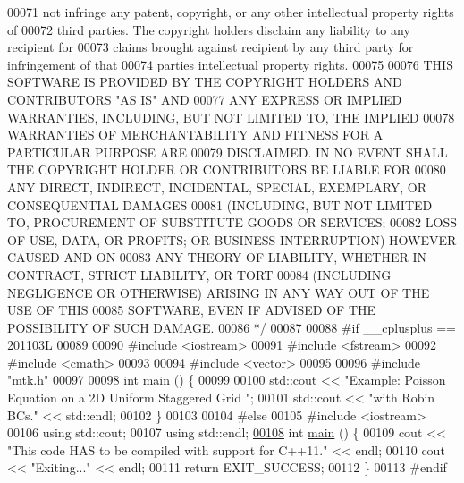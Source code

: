 \begin{DoxyCode}
00071 \textcolor{comment}{not infringe any patent, copyright, or any other intellectual property rights of}
00072 \textcolor{comment}{third parties. The copyright holders disclaim any liability to any recipient for}
00073 \textcolor{comment}{claims brought against recipient by any third party for infringement of that}
00074 \textcolor{comment}{parties intellectual property rights.}
00075 \textcolor{comment}{}
00076 \textcolor{comment}{THIS SOFTWARE IS PROVIDED BY THE COPYRIGHT HOLDERS AND CONTRIBUTORS "AS IS" AND}
00077 \textcolor{comment}{ANY EXPRESS OR IMPLIED WARRANTIES, INCLUDING, BUT NOT LIMITED TO, THE IMPLIED}
00078 \textcolor{comment}{WARRANTIES OF MERCHANTABILITY AND FITNESS FOR A PARTICULAR PURPOSE ARE}
00079 \textcolor{comment}{DISCLAIMED. IN NO EVENT SHALL THE COPYRIGHT HOLDER OR CONTRIBUTORS BE LIABLE FOR}
00080 \textcolor{comment}{ANY DIRECT, INDIRECT, INCIDENTAL, SPECIAL, EXEMPLARY, OR CONSEQUENTIAL DAMAGES}
00081 \textcolor{comment}{(INCLUDING, BUT NOT LIMITED TO, PROCUREMENT OF SUBSTITUTE GOODS OR SERVICES;}
00082 \textcolor{comment}{LOSS OF USE, DATA, OR PROFITS; OR BUSINESS INTERRUPTION) HOWEVER CAUSED AND ON}
00083 \textcolor{comment}{ANY THEORY OF LIABILITY, WHETHER IN CONTRACT, STRICT LIABILITY, OR TORT}
00084 \textcolor{comment}{(INCLUDING NEGLIGENCE OR OTHERWISE) ARISING IN ANY WAY OUT OF THE USE OF THIS}
00085 \textcolor{comment}{SOFTWARE, EVEN IF ADVISED OF THE POSSIBILITY OF SUCH DAMAGE.}
00086 \textcolor{comment}{*/}
00087 
00088 \textcolor{preprocessor}{#if \_\_cplusplus == 201103L}
00089 
00090 \textcolor{preprocessor}{#include <iostream>}
00091 \textcolor{preprocessor}{#include <fstream>}
00092 \textcolor{preprocessor}{#include <cmath>}
00093 
00094 \textcolor{preprocessor}{#include <vector>}
00095 
00096 \textcolor{preprocessor}{#include "\hyperlink{mtk_8h}{mtk.h}"}
00097 
00098 \textcolor{keywordtype}{int} \hyperlink{poisson__2d_8cc_ae66f6b31b5ad750f1fe042a706a4e3d4}{main} () \{
00099 
00100   std::cout << \textcolor{stringliteral}{"Example: Poisson Equation on a 2D Uniform Staggered Grid "};
00101   std::cout << \textcolor{stringliteral}{"with Robin BCs."} << std::endl;
00102 \}
00103 
00104 \textcolor{preprocessor}{#else}
00105 \textcolor{preprocessor}{#include <iostream>}
00106 \textcolor{keyword}{using} std::cout;
00107 \textcolor{keyword}{using} std::endl;
\hypertarget{poisson__2d_8cc_source_l00108}{}\hyperlink{poisson__2d_8cc_ae66f6b31b5ad750f1fe042a706a4e3d4}{00108} \textcolor{keywordtype}{int} \hyperlink{poisson__2d_8cc_ae66f6b31b5ad750f1fe042a706a4e3d4}{main} () \{
00109   cout << \textcolor{stringliteral}{"This code HAS to be compiled with support for C++11."} << endl;
00110   cout << \textcolor{stringliteral}{"Exiting..."} << endl;
00111   \textcolor{keywordflow}{return} EXIT\_SUCCESS;
00112 \}
00113 \textcolor{preprocessor}{#endif}
\end{DoxyCode}
